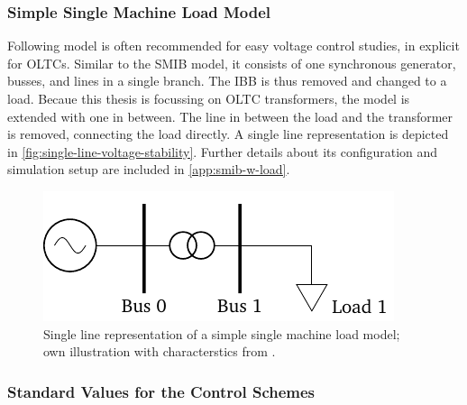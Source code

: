 \subsubsection{Simple Single Machine Load Model}

Following model is often recommended \autocite{kundur_2022,machowski_2020} for easy voltage control studies, in explicit for \acsp{OLTC}. 
Similar to the \ac{SMIB} model, it consists of one synchronous generator, busses, and lines in a single branch. 
The \acf{IBB} is thus removed and changed to a load. 
Becaue this thesis is focussing on \acs{OLTC} transformers, the model is extended with one in between. 
The line in between the load and the transformer is removed, connecting the load directly.
A single line representation is depicted in \autoref{fig:single-line-voltage-stability}.
Further details about its configuration and simulation setup are included in \autoref{app:smib-w-load}. 

\begin{figure}[htbp!]
    \centering
    \vspace{12pt}
    \includegraphics{tikz_graphics/images/sm_load_model.pdf}
    \vspace{12pt}
    \caption[Single line representation of a simple single machine load model]{Single line representation of a simple single machine load model; own illustration with characterstics from \autocite{kundur_2022}.}
    \label{fig:single-line-voltage-stability}
\end{figure}

\subsubsection{Standard Values for the Control Schemes}


